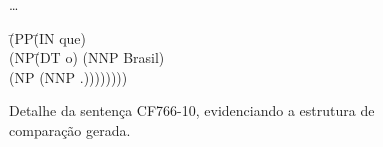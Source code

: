 \begin{figure}[!ht]
    \centering
        \begin{minipage}{.4\textwidth}
        \ldots
        \begin{tabbing}
            \=(PP\= (IN que)\+\\
            \>      (NP\= (DT o) (NNP Brasil)\+\\
            \>        (NP (NNP .))))))))\\
        \end{tabbing}
    \end{minipage}
    \caption[Detalhe evidenciando a estrutura de comparação gerada pelo SP]{Detalhe da sentença CF766-10, evidenciando a estrutura de comparação gerada.}
    \label{fig:ec_bosque_komp_detalhe}
\end{figure}